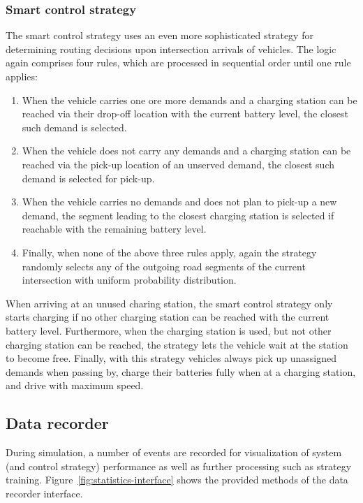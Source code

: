 \documentclass[10pt,twocolumn]{article}
\begin{document}
\subsubsection*{Smart control strategy}
\label{sec:controller-smart}

The smart control strategy uses an even more sophisticated strategy for determining routing decisions upon intersection arrivals of vehicles.
The logic again comprises four rules, which are processed in sequential order until one rule applies:
\begin{enumerate}
    \item When the vehicle carries one ore more demands and a charging station can be reached via their drop-off location with the current battery level, the closest such demand is selected.
    \item When the vehicle does not carry any demands and a charging station can be reached via the pick-up location of an unserved demand, the closest such demand is selected for pick-up.
    \item When the vehicle carries no demands and does not plan to pick-up a new demand, the segment leading to the closest charging station is selected if reachable with the remaining battery level.
    \item Finally, when none of the above three rules apply, again the strategy randomly selects any of the outgoing road segments of the current intersection with uniform probability distribution.
\end{enumerate}
When arriving at an unused charing station, the smart control strategy only starts charging if no other charging station can be reached with the current battery level.
Furthermore, when the charging station is used, but not other charging station can be reached, the strategy lets the vehicle wait at the station to become free.
Finally, with this strategy vehicles always pick up unassigned demands when passing by, charge their batteries fully when at a charging station, and drive with maximum speed.

\subsection{Data recorder}
\label{sec:statistics-interface}

During simulation, a number of events are recorded for visualization of system (and control strategy) performance as well as further processing such as strategy training.
Figure~\ref{fig:statistics-interface} shows the provided methods of the data recorder interface.
\end{document}
